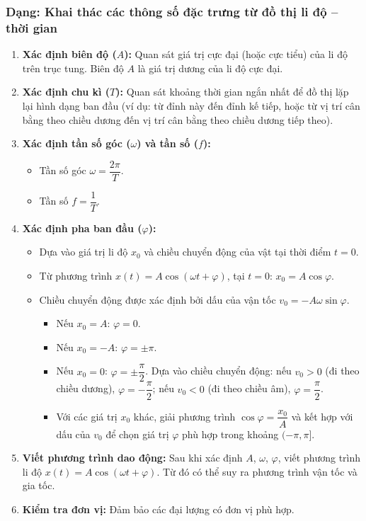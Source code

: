 \subsubsection{Dạng: Khai thác các thông số đặc trưng từ đồ thị li độ – thời gian}
\begin{phuongphap}
\begin{enumerate}
    \item \textbf{Xác định biên độ ($A$):} Quan sát giá trị cực đại (hoặc cực tiểu) của li độ trên trục tung. Biên độ $A$ là giá trị dương của li độ cực đại.
    \item \textbf{Xác định chu kì ($T$):} Quan sát khoảng thời gian ngắn nhất để đồ thị lặp lại hình dạng ban đầu (ví dụ: từ đỉnh này đến đỉnh kế tiếp, hoặc từ vị trí cân bằng theo chiều dương đến vị trí cân bằng theo chiều dương tiếp theo).
    \item \textbf{Xác định tần số góc ($\omega$) và tần số ($f$):}
    \begin{itemize}
        \item Tần số góc $\omega = \dfrac{2\pi}{T}$.
        \item Tần số $f = \dfrac{1}{T}$.
    \end{itemize}
    \item \textbf{Xác định pha ban đầu ($\varphi$):}
    \begin{itemize}
        \item Dựa vào giá trị li độ $x_0$ và chiều chuyển động của vật tại thời điểm $t=0$.
        \item Từ phương trình $x(t) = A\cos(\omega t + \varphi)$, tại $t=0$: $x_0 = A\cos\varphi$.
        \item Chiều chuyển động được xác định bởi dấu của vận tốc $v_0 = -A\omega\sin\varphi$.
        \begin{itemize}
            \item Nếu $x_0 = A$: $\varphi = 0$.
            \item Nếu $x_0 = -A$: $\varphi = \pm\pi$.
            \item Nếu $x_0 = 0$: $\varphi = \pm\dfrac{\pi}{2}$. Dựa vào chiều chuyển động: nếu $v_0 > 0$ (đi theo chiều dương), $\varphi = -\dfrac{\pi}{2}$; nếu $v_0 < 0$ (đi theo chiều âm), $\varphi = \dfrac{\pi}{2}$.
            \item Với các giá trị $x_0$ khác, giải phương trình $\cos\varphi = \dfrac{x_0}{A}$ và kết hợp với dấu của $v_0$ để chọn giá trị $\varphi$ phù hợp trong khoảng $(-\pi, \pi]$.
        \end{itemize}
    \end{itemize}
    \item \textbf{Viết phương trình dao động:} Sau khi xác định $A$, $\omega$, $\varphi$, viết phương trình li độ $x(t) = A\cos(\omega t + \varphi)$. Từ đó có thể suy ra phương trình vận tốc và gia tốc.
    \item \textbf{Kiểm tra đơn vị:} Đảm bảo các đại lượng có đơn vị phù hợp.
\end{enumerate}
\end{phuongphap}
